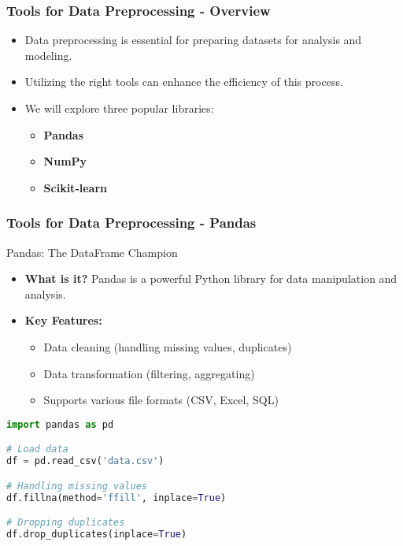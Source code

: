 \documentclass[aspectratio=169]{beamer}
\begin{document}
\begin{frame}[fragile]
    \frametitle{Tools for Data Preprocessing - Overview}
    \begin{itemize}
        \item Data preprocessing is essential for preparing datasets for analysis and modeling.
        \item Utilizing the right tools can enhance the efficiency of this process.
        \item We will explore three popular libraries:
        \begin{itemize}
            \item \textbf{Pandas}
            \item \textbf{NumPy}
            \item \textbf{Scikit-learn}
        \end{itemize}
    \end{itemize}
\end{frame}

\begin{frame}[fragile]
    \frametitle{Tools for Data Preprocessing - Pandas}
    \begin{block}{Pandas: The DataFrame Champion}
        \begin{itemize}
            \item \textbf{What is it?}  
            Pandas is a powerful Python library for data manipulation and analysis.
            \item \textbf{Key Features:}
            \begin{itemize}
                \item Data cleaning (handling missing values, duplicates)
                \item Data transformation (filtering, aggregating)
                \item Supports various file formats (CSV, Excel, SQL)
            \end{itemize}
        \end{itemize}
    \end{block}
    \begin{lstlisting}[language=Python]
import pandas as pd

# Load data
df = pd.read_csv('data.csv')

# Handling missing values
df.fillna(method='ffill', inplace=True)

# Dropping duplicates
df.drop_duplicates(inplace=True)
    \end{lstlisting}
\end{frame}
\end{document}
